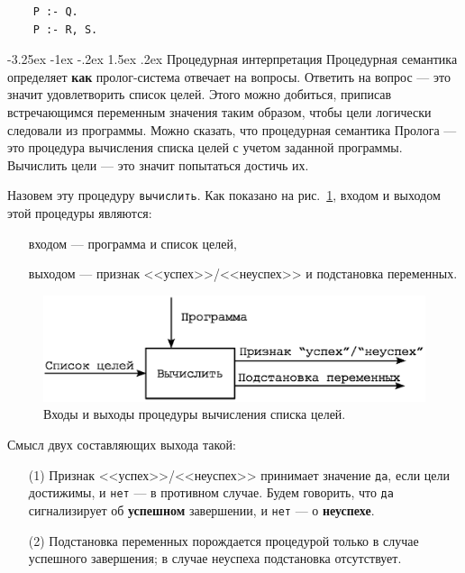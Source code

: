 \documentclass[12pt, openany, twoside]{book} %
\makeatletter
\renewcommand\section{\@startsection {section}{1}{\z@}%
                                   {-3.25ex \@plus -1ex \@minus -.2ex}%
                                   {1.5ex \@plus.2ex}%
                                   {\normalfont\large\bfseries}}
\makeatother
\begin{document}
{\tt\begin{verbatim}
    Р :- Q.
    Р :- R, S.
\end{verbatim}}

\section{Процедурная интерпретация}
Процедурная семантика определяет \textbf{как} пролог-система отвечает на вопросы. Ответить на вопрос --- это значит удовлетворить список целей. Этого можно добиться, приписав встречающимся переменным значения таким образом, чтобы цели логически следовали из программы. Можно сказать, что процедурная семантика Пролога --- это процедура вычисления списка целей с учетом заданной программы. Вычислить цели --- это значит попытаться достичь их.

Назовем эту процедуру \texttt{вычислить}. Как показано на рис.~\ref{pic:proc}, входом и выходом этой процедуры являются:
\begin{itemize}
\item[] входом --- программа и список целей,
\item[] выходом --- признак <<успех>>/<<неуспех>> и подстановка переменных.
\end{itemize}

\begin{figure}[h]
\begin{center}
\includegraphics[scale=0.7]{pics/imp_proc.eps}
\end{center}
\caption{Входы и выходы процедуры вычисления списка целей.}
\label{pic:proc}
\end{figure}

\noindent Смысл двух составляющих выхода такой:
\begin{itemize}
\item[(1)] Признак <<успех>>/<<неуспех>> принимает значение {\tt да}, если цели достижимы, и {\tt нет} --- в противном случае. Будем говорить, что {\tt да} сигнализирует об {\bf успешном} завершении, и {\tt нет} --- о {\bf неуспехе}.

\item[(2)] Подстановка переменных порождается процедурой только в случае успешного завершения; в случае неуспеха подстановка отсутствует.
\end{itemize}
\end{document}
